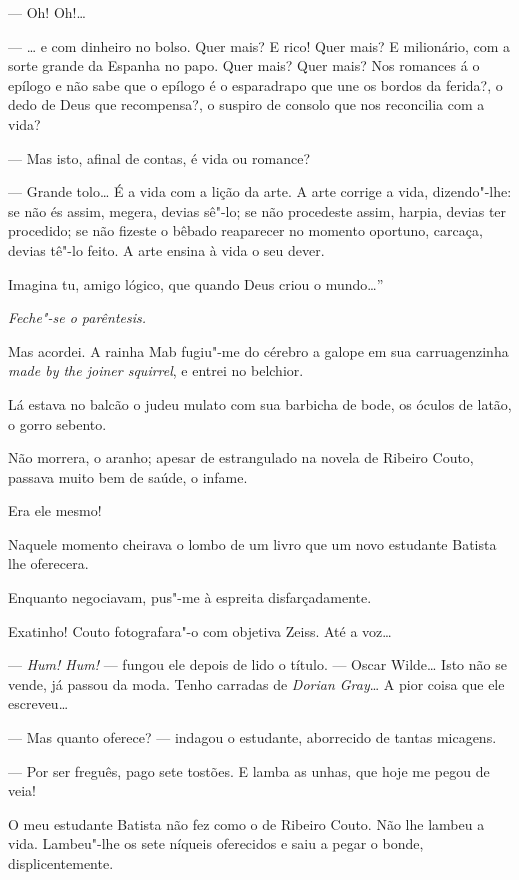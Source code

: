 --- Oh! Oh!\ldots{}

--- \ldots{} e com dinheiro no bolso. Quer mais? E rico! Quer mais? E
milionário, com a sorte grande da Espanha no papo. Quer mais? Quer mais?
Nos romances á o epílogo e não sabe que o epílogo é o esparadrapo que
une os bordos da ferida?, o dedo de Deus que recompensa?, o suspiro de
consolo que nos reconcilia com a vida?

--- Mas isto, afinal de contas, é vida ou romance?

--- Grande tolo\ldots{} É a vida com a lição da arte. A arte corrige a vida,
dizendo"-lhe: se não és assim, megera, devias sê"-lo; se não procedeste
assim, harpia, devias ter procedido; se não fizeste o bêbado reaparecer
no momento oportuno, carcaça, devias tê"-lo feito. A arte ensina à vida o
seu dever.

Imagina tu, amigo lógico, que quando Deus criou o mundo\ldots{}''

\emph{Feche"-se o parêntesis.}

Mas acordei. A rainha Mab fugiu"-me do cérebro a galope em sua
carruagenzinha \emph{made by the joiner squirrel}, e entrei no belchior.

Lá estava no balcão o judeu mulato com sua barbicha de bode, os óculos
de latão, o gorro sebento.

Não morrera, o aranho; apesar de estrangulado na novela de Ribeiro
Couto, passava muito bem de saúde, o infame.

Era ele mesmo!

Naquele momento cheirava o lombo de um livro que um novo estudante
Batista lhe oferecera.

Enquanto negociavam, pus"-me à espreita disfarçadamente.

Exatinho! Couto fotografara"-o com objetiva Zeiss. Até a voz\ldots{}

--- \emph{Hum! Hum!} --- fungou ele depois de lido o título. --- Oscar
Wilde\ldots{} Isto não se vende, já passou da moda. Tenho carradas de
\emph{Dorian Gray}\ldots{} A pior coisa que ele escreveu\ldots{}

--- Mas quanto oferece? --- indagou o estudante, aborrecido de tantas
micagens.

--- Por ser freguês, pago sete tostões. E lamba as unhas, que hoje me
pegou de veia!

O meu estudante Batista não fez como o de Ribeiro Couto. Não lhe lambeu
a vida. Lambeu"-lhe os sete níqueis oferecidos e saiu a pegar o bonde,
displicentemente.

